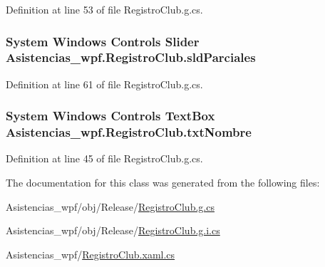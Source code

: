 Definition at line 53 of file Registro\-Club.\-g.\-cs.

\hypertarget{class_asistencias__wpf_1_1_registro_club_aff736140d07e1db41578a56e774b437c}{
\subsubsection[{sld\-Parciales}]{\setlength{\rightskip}{0pt plus 5cm}System Windows Controls Slider Asistencias\-\_\-wpf.\-Registro\-Club.\-sld\-Parciales\hspace{0.3cm}{\ttfamily [package]}}}\label{class_asistencias__wpf_1_1_registro_club_aff736140d07e1db41578a56e774b437c}


Definition at line 61 of file Registro\-Club.\-g.\-cs.

\hypertarget{class_asistencias__wpf_1_1_registro_club_a9acb8f17b99701c92a5afec34b18ea0b}{
\subsubsection[{txt\-Nombre}]{\setlength{\rightskip}{0pt plus 5cm}System Windows Controls Text\-Box Asistencias\-\_\-wpf.\-Registro\-Club.\-txt\-Nombre\hspace{0.3cm}{\ttfamily [package]}}}\label{class_asistencias__wpf_1_1_registro_club_a9acb8f17b99701c92a5afec34b18ea0b}


Definition at line 45 of file Registro\-Club.\-g.\-cs.



The documentation for this class was generated from the following files\-:\begin{DoxyCompactItemize}
\item 
Asistencias\-\_\-wpf/obj/\-Release/\hyperlink{_registro_club_8g_8cs}{Registro\-Club.\-g.\-cs}\item 
Asistencias\-\_\-wpf/obj/\-Release/\hyperlink{_registro_club_8g_8i_8cs}{Registro\-Club.\-g.\-i.\-cs}\item 
Asistencias\-\_\-wpf/\hyperlink{_registro_club_8xaml_8cs}{Registro\-Club.\-xaml.\-cs}\end{DoxyCompactItemize}
